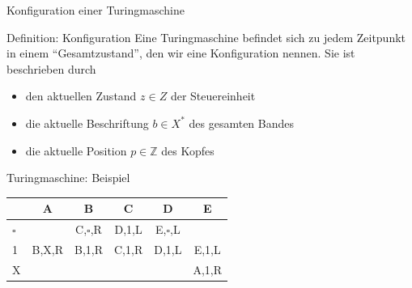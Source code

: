 \begin{frame}{Konfiguration einer Turingmaschine}
    \begin{block}{Definition: Konfiguration}
        Eine Turingmaschine befindet sich zu jedem Zeitpunkt in einem ``Gesamtzustand'', den wir eine Konfiguration nennen. Sie ist beschrieben durch
        \begin{itemize}
            \item den aktuellen Zustand $z \in Z$ der Steuereinheit
            \item die aktuelle Beschriftung $b\in X^*$ des gesamten Bandes
            \item die aktuelle Position $p \in \mathbb{Z}$ des Kopfes
        \end{itemize}
    \end{block}
\end{frame}
\begin{frame}{Turingmaschine: Beispiel}
    \begin{figure}
        \centering
\end{figure}
    \begin{table}
        \begin{tabular}{lccccc}
        \toprule
                  & A     & B             & C         & D                 & E \\
        \midrule
        $\square$ &       & C,$\square$,R & D,1,L     & E,$\square$,L     &  \\
        1         & B,X,R & B,1,R         & C,1,R     & D,1,L             & E,1,L \\
        X         &       &               &           &                   & A,1,R \\
        \bottomrule
        \end{tabular}
    \end{table}
\end{frame}
